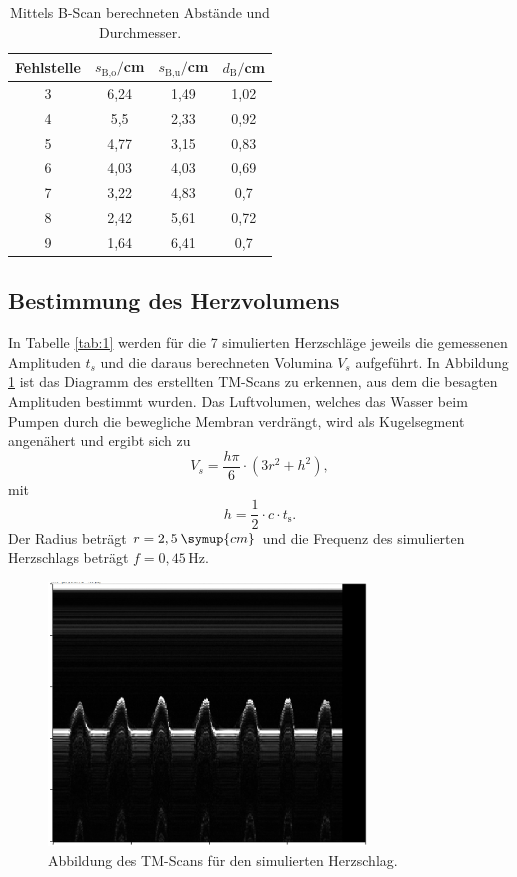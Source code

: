 \begin{table}[H]
  \centering
  \caption{Mittels B-Scan berechneten Abstände und Durchmesser.}
  \begin{tabular}{c c c c}
    \toprule
  Fehlstelle & $s_\text{B,o}/$cm & $s_\text{B,u}/$cm & $d_\text{B}/$cm\\
    \midrule
    3   & 6,24 & 1,49  & 1,02   \\
    4   & 5,5  & 2,33  & 0,92   \\
    5   & 4,77 & 3,15  & 0,83   \\
    6   & 4,03 & 4,03  & 0,69   \\
    7   & 3,22 & 4,83  & 0,7    \\
    8   & 2,42 & 5,61  & 0,72   \\
    9   & 1,64 & 6,41  & 0,7  \\
    \bottomrule
  \end{tabular}
\end{table}




\subsection{Bestimmung des Herzvolumens}
In Tabelle \ref{tab:1} werden für die 7 simulierten Herzschläge jeweils die gemessenen Amplituden $t_s$ und die daraus berechneten
Volumina $V_s$ aufgeführt. In Abbildung \ref{fig:TM} ist das Diagramm des erstellten TM-Scans zu erkennen, aus dem die besagten Amplituden
bestimmt wurden. Das Luftvolumen, welches das Wasser beim Pumpen durch die bewegliche Membran verdrängt, wird als
Kugelsegment angenähert und ergibt sich zu
\begin{equation*}
  V_s = \frac{h\pi}{6}\cdot(3r^2 + h^2),
\end{equation*}
mit
\begin{equation*}
h = \frac{1}{2}\cdot c \cdot t_\text{s}.
\end{equation*}
Der Radius beträgt $r = 2,5 \: \symup{cm}$ und die Frequenz des simulierten
Herzschlags beträgt $f = 0,45\,\si{\hertz}$.

\begin{figure}[H]
  \centering
  \includegraphics[height=7cm]{tm-herz.png}
  \caption{Abbildung des TM-Scans für den simulierten Herzschlag.}
  \label{fig:TM}
\end{figure}

